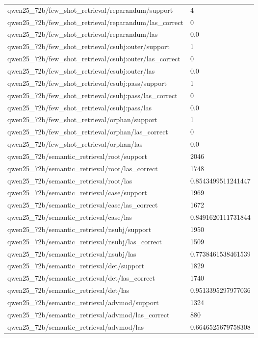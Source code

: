 \begin{tabular}{ll}
qwen25\_72b/few\_shot\_retrieval/reparandum/support & 4 \\
qwen25\_72b/few\_shot\_retrieval/reparandum/las\_correct & 0 \\
qwen25\_72b/few\_shot\_retrieval/reparandum/las & 0.0 \\
qwen25\_72b/few\_shot\_retrieval/csubj:outer/support & 1 \\
qwen25\_72b/few\_shot\_retrieval/csubj:outer/las\_correct & 0 \\
qwen25\_72b/few\_shot\_retrieval/csubj:outer/las & 0.0 \\
qwen25\_72b/few\_shot\_retrieval/csubj:pass/support & 1 \\
qwen25\_72b/few\_shot\_retrieval/csubj:pass/las\_correct & 0 \\
qwen25\_72b/few\_shot\_retrieval/csubj:pass/las & 0.0 \\
qwen25\_72b/few\_shot\_retrieval/orphan/support & 1 \\
qwen25\_72b/few\_shot\_retrieval/orphan/las\_correct & 0 \\
qwen25\_72b/few\_shot\_retrieval/orphan/las & 0.0 \\
qwen25\_72b/semantic\_retrieval/root/support & 2046 \\
qwen25\_72b/semantic\_retrieval/root/las\_correct & 1748 \\
qwen25\_72b/semantic\_retrieval/root/las & 0.8543499511241447 \\
qwen25\_72b/semantic\_retrieval/case/support & 1969 \\
qwen25\_72b/semantic\_retrieval/case/las\_correct & 1672 \\
qwen25\_72b/semantic\_retrieval/case/las & 0.8491620111731844 \\
qwen25\_72b/semantic\_retrieval/nsubj/support & 1950 \\
qwen25\_72b/semantic\_retrieval/nsubj/las\_correct & 1509 \\
qwen25\_72b/semantic\_retrieval/nsubj/las & 0.7738461538461539 \\
qwen25\_72b/semantic\_retrieval/det/support & 1829 \\
qwen25\_72b/semantic\_retrieval/det/las\_correct & 1740 \\
qwen25\_72b/semantic\_retrieval/det/las & 0.9513395297977036 \\
qwen25\_72b/semantic\_retrieval/advmod/support & 1324 \\
qwen25\_72b/semantic\_retrieval/advmod/las\_correct & 880 \\
qwen25\_72b/semantic\_retrieval/advmod/las & 0.6646525679758308 \\

\end{tabular}
